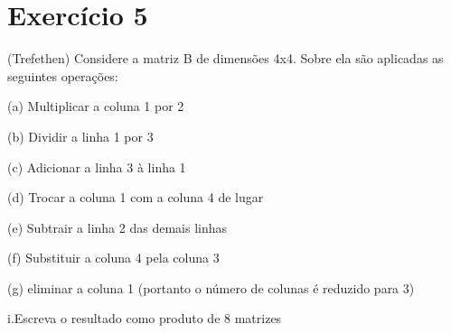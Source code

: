 \documentclass[12pt,a4paper]{article}
\begin{document}
\newpage
\section*{Exercício 5}
(Trefethen) Considere a matriz B de dimensões 4x4. Sobre ela são aplicadas as seguintes operações:

(a) Multiplicar a coluna 1 por 2

(b) Dividir a linha 1 por 3

(c) Adicionar a linha 3 à linha 1

(d) Trocar a coluna 1 com a coluna 4 de lugar

(e) Subtrair a linha 2 das demais linhas

(f) Substituir a coluna 4 pela coluna 3

(g) eliminar a coluna 1 (portanto o número de colunas é reduzido para 3)

i.Escreva o resultado como produto de 8 matrizes
\end{document}
